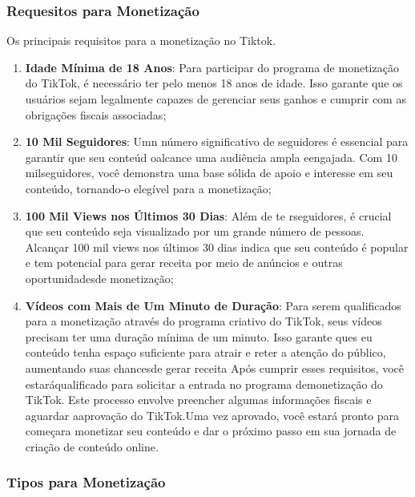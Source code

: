 \subsubsection{Requesitos para Monetização}

Os principais requisitos para a monetização no Tiktok.

\begin{enumerate}
    \item \textbf{Idade Mínima de 18 Anos}: Para participar do programa de monetização do TikTok, é necessário ter pelo menos 18 anos de idade. Isso garante que os usuários sejam legalmente capazes de gerenciar seus ganhos e cumprir com as obrigações fiscais associadas;
    \item \textbf{10 Mil Seguidores}: Umn número significativo de seguidores é essencial para garantir que seu conteúd oalcance uma audiência ampla eengajada. Com 10 milseguidores, você demonstra uma base sólida de apoio e interesse em seu conteúdo, tornando-o elegível para a monetização;
    \item \textbf{100 Mil Views nos Últimos 30 Dias}: Além de te rseguidores, é crucial que seu conteúdo seja visualizado por um grande número de pessoas. Alcançar 100 mil views nos últimos 30 dias indica que seu conteúdo é popular e tem potencial para gerar receita por meio de anúncios e outras oportunidadesde monetização;
    \item \textbf{Vídeos com Mais de Um Minuto de Duração}: Para serem qualificados para a monetização através do programa criativo do TikTok, seus vídeos precisam ter uma duração mínima de um minuto. Isso garante ques eu conteúdo tenha espaço suficiente para atrair e reter a atenção do público, aumentando suas chancesde gerar receita Após cumprir esses requisitos, você estaráqualificado para solicitar a entrada no programa demonetização do TikTok. Este processo envolve preencher algumas informações fiscais e aguardar aaprovação do TikTok.Uma vez aprovado, você estará pronto para começara monetizar seu conteúdo e dar o próximo passo em sua jornada de criação de conteúdo online.
    \end{enumerate}

\newpage
\subsubsection{Tipos para Monetização}

